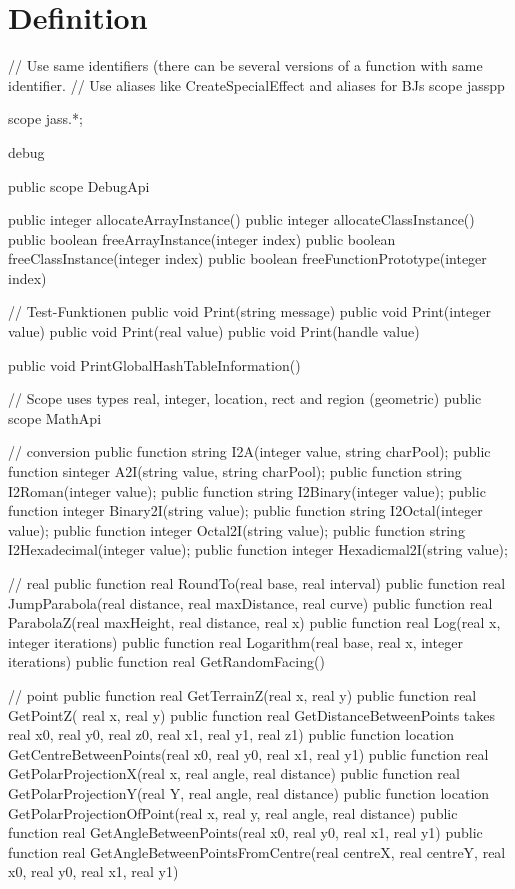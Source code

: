 \section { Definition }
// Use same identifiers (there can be several versions of a function with same identifier.
// Use aliases like CreateSpecialEffect and aliases for BJs
scope jasspp
{
	scope jass.*;

	debug
	{
		public scope DebugApi
		{
			public integer allocateArrayInstance()
			public integer allocateClassInstance()
			public boolean freeArrayInstance(integer index)
			public boolean freeClassInstance(integer index)
			public boolean freeFunctionPrototype(integer index)

			// Test-Funktionen
			public void Print(string message)
			public void Print(integer value)
			public void Print(real value)
			public void Print(handle value)

			public void PrintGlobalHashTableInformation()
		}
	}

	// Scope uses types real, integer, location, rect and region (geometric)
	public scope MathApi
	{
		// conversion
		public function string I2A(integer value, string charPool);
		public function sinteger A2I(string value, string charPool);
		public function string I2Roman(integer value);
		public function string	I2Binary(integer value);
		public function integer Binary2I(string value);
		public function string	I2Octal(integer value);
		public function integer Octal2I(string value);
		public function string I2Hexadecimal(integer value);
		public function integer Hexadicmal2I(string value);

		// real
		public function real RoundTo(real base, real interval)
		public function real JumpParabola(real distance, real maxDistance, real curve)
		public function real ParabolaZ(real maxHeight, real distance, real x)
		public function real Log(real x, integer iterations)
		public function real Logarithm(real base, real x, integer iterations)
		public function real GetRandomFacing()

		// point
		public function real GetTerrainZ(real x, real y)
		public function real GetPointZ( real x, real y)
		public function real GetDistanceBetweenPoints takes real x0, real y0, real z0, real x1, real y1, real z1)
		public function location GetCentreBetweenPoints(real x0, real y0, real x1, real y1)
		public function real GetPolarProjectionX(real x, real angle, real distance)
		public function real GetPolarProjectionY(real Y, real angle, real distance)
		public function location GetPolarProjectionOfPoint(real x, real y, real angle, real distance)
		public function real GetAngleBetweenPoints(real x0, real y0, real x1, real y1)
		public function real GetAngleBetweenPointsFromCentre(real centreX, real centreY, real x0, real y0, real x1, real y1)


}}
